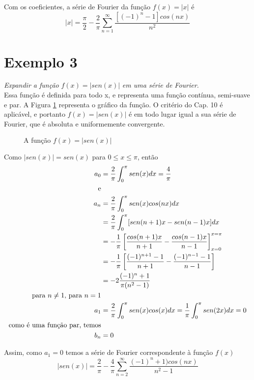 Com os coeficientes, a série de Fourier da função $f(x) = |x|$ é
\begin{equation}
    |x| = \dfrac{\pi}{2} - \dfrac{2}{\pi}\sum\limits_{n=1}^{\infty} \dfrac{[(-1)^n - 1]cos(nx)}{n^2}
\end{equation}

\section*{Exemplo 3}
\textit{Expandir a função }$f(x) = |sen(x)|$\textit{ em uma série de Fourier.}\\

Essa função é definida para todo x, e representa uma função contínua, semi-suave e par. 
A Figura \ref{fig:exemplo3} representa o gráfico da função. O critério do Cap. 10 é 
aplicável, e portanto $f(x) = |sen(x)|$ é em todo lugar igual a sua série de Fourier,
que é absoluta e uniformemente convergente.

\begin{figure}[H]

    \caption{A função $f(x) = |sen(x)|$}
    \label{fig:exemplo3}
\end{figure}

Como $|sen(x)| = sen(x)$ para $0 \leq x \leq \pi$, então
\begin{equation}
    \notag
    \label{eq:exemplo3}
    \begin{split}
        a_0 &= \dfrac{2}{\pi} \int_{0}^{\pi}sen(x)dx = \dfrac{4}{\pi}\\
        \text{e}&\\
        a_n &= \dfrac{2}{\pi}\int_{0}^{\pi}sen(x)cos(nx)dx\\
        &= \dfrac{2}{\pi}\int_{0}^{\pi}[sen(n + 1)x - sen(n - 1)x]dx\\
        &= -\dfrac{1}{\pi}\left[\dfrac{cos(n+1)x}{n+1} - \dfrac{cos(n - 1)x}{n - 1}\right]_{x=0}^{x=\pi}\\
        &= -\dfrac{1}{\pi}\left[\dfrac{(-1)^{n+1}-1}{n+1} - \dfrac{(-1)^{n-1}-1}{n - 1}\right]\\
        &= -2\dfrac{(-1)^n + 1}{\pi(n^2 -1)}\\
        \text{para }n \neq 1\text{, para }n=1 &\\
        a_1 &= \dfrac{2}{\pi}\int_{0}^{\pi}sen(x)cos(x)dx =\dfrac{1}{\pi}\int_{0}^{\pi}sen(2x)dx = 0\\
        \text{como é uma função par, temos}&\\
        b_n &= 0
    \end{split} 
\end{equation}

Assim, como $a_1 = 0$ temos a série de Fourier correspondente à função $f(x)$
\begin{equation}
    |sen(x)| = \dfrac{2}{\pi} - \dfrac{4}{\pi}\sum\limits_{n=2}^{\infty}\dfrac{(-1)^n + 1)cos(nx)}{n^2 - 1}
\end{equation}